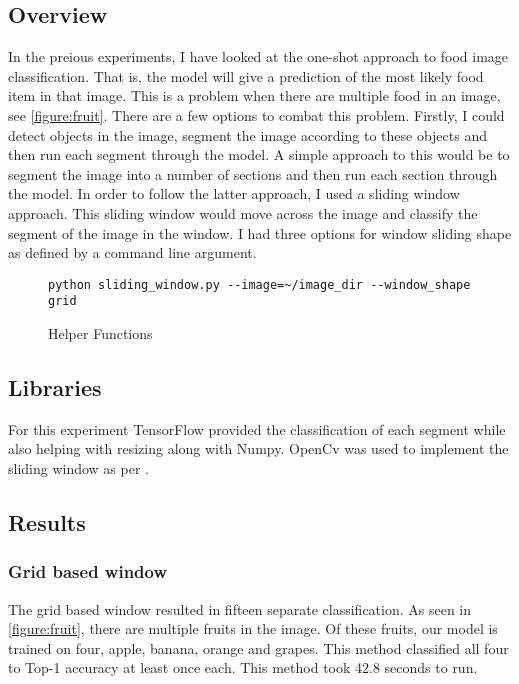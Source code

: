 \tocless\subsection{Overview}
In the preious experiments, I have looked at the one-shot approach to food image
classification. That is, the model will give a prediction of the most likely
food item in that image. This is a problem when there are multiple food in an
image, see \ref{figure:fruit}. There are a few options to combat this problem. Firstly, I could detect
objects in the image, segment the image according to these objects and then run
each segment through the model. A simple approach to this would be to segment
the image into a number of sections and then run each section through the model.
In order to follow the latter approach, I used a sliding window approach. This
sliding window would move across the image and classify the segment of the image
in the window. I had three options for window sliding shape as defined by a
command line argument.

\begin{figure}
\caption{Helper Functions}
\label{lst:helperFunctions}
\begin{lstlisting}
python sliding_window.py --image=~/image_dir --window_shape grid
\end{lstlisting}
\end{figure}

\tocless\subsection{Libraries}
For this experiment TensorFlow provided the classification of each segment while
also helping with resizing along with Numpy. OpenCv was used to implement the
sliding window as per \parencite{slidingWindowTut}.

\tocless\subsection{Results}
\tocless\subsubsection{Grid based window}
The grid based window resulted in fifteen separate classification. As seen in
\ref{figure:fruit}, there are multiple fruits in the image. Of these fruits, our
model is trained on four, apple, banana, orange and grapes. This method
classified all four to Top-1 accuracy at least once each. This method took 42.8
seconds to run.

